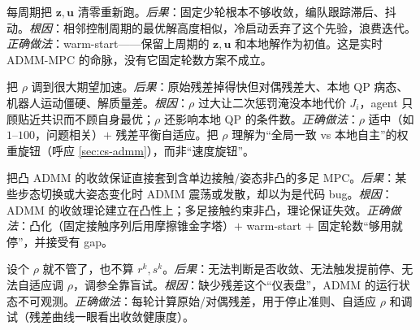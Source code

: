 \begin{pitfall}
每周期把 $\mathbf{z},\mathbf{u}$ 清零重新跑。\emph{后果}：固定少轮根本不够收敛，编队跟踪滞后、抖动。\emph{根因}：相邻控制周期的最优解高度相似，冷启动丢弃了这个先验，浪费迭代。\emph{正确做法}：warm-start——保留上周期的 $\mathbf{z},\mathbf{u}$ 和本地解作为初值。这是实时 ADMM-MPC 的命脉，没有它固定轮数方案不成立。
\end{pitfall}

\begin{pitfall}
把 $\rho$ 调到很大期望加速。\emph{后果}：原始残差掉得快但对偶残差大、本地 QP 病态、机器人运动僵硬、解质量差。\emph{根因}：$\rho$ 过大让二次惩罚淹没本地代价 $J_i$，agent 只顾贴近共识而不顾自身最优；$\rho$ 还影响本地 QP 的条件数。\emph{正确做法}：$\rho$ 适中（如 $1$–$100$，问题相关）$+$ 残差平衡自适应。把 $\rho$ 理解为“全局一致 vs 本地自主”的权重旋钮（呼应 \cref{sec:cs-admm}），而非“速度旋钮”。
\end{pitfall}

\begin{pitfall}
把凸 ADMM 的收敛保证直接套到含单边接触/姿态非凸的多足 MPC。\emph{后果}：某些步态切换或大姿态变化时 ADMM 震荡或发散，却以为是代码 bug。\emph{根因}：ADMM 的收敛理论建立在凸性上；多足接触约束非凸，理论保证失效。\emph{正确做法}：凸化（固定接触序列后用摩擦锥金字塔）$+$ warm-start $+$ 固定轮数“够用就停”，并接受有 gap。
\end{pitfall}

\begin{pitfall}
设个 $\rho$ 就不管了，也不算 $r^k,s^k$。\emph{后果}：无法判断是否收敛、无法触发提前停、无法自适应调 $\rho$，调参全靠盲试。\emph{根因}：缺少残差这个“仪表盘”，ADMM 的运行状态不可观测。\emph{正确做法}：每轮计算原始/对偶残差，用于停止准则、自适应 $\rho$ 和调试（残差曲线一眼看出收敛健康度）。
\end{pitfall}

